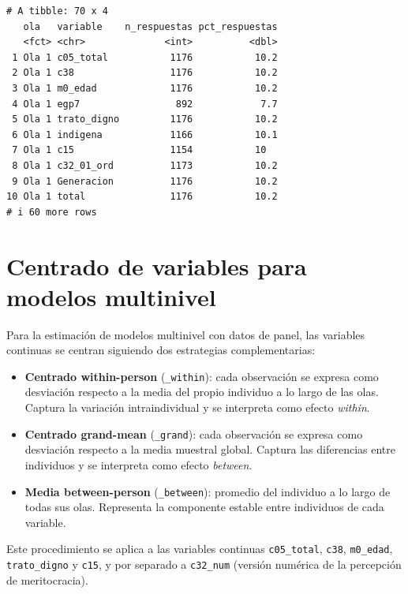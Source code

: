 \documentclass[
  spanish,
  a4paper,
  oneside]{scrbook}
\providecommand{\tightlist}{%
  \setlength{\itemsep}{0pt}\setlength{\parskip}{0pt}}
\begin{document}
\begin{verbatim}
# A tibble: 70 x 4
   ola   variable    n_respuestas pct_respuestas
   <fct> <chr>              <int>          <dbl>
 1 Ola 1 c05_total           1176           10.2
 2 Ola 1 c38                 1176           10.2
 3 Ola 1 m0_edad             1176           10.2
 4 Ola 1 egp7                 892            7.7
 5 Ola 1 trato_digno         1176           10.2
 6 Ola 1 indigena            1166           10.1
 7 Ola 1 c15                 1154           10  
 8 Ola 1 c32_01_ord          1173           10.2
 9 Ola 1 Generacion          1176           10.2
10 Ola 1 total               1176           10.2
# i 60 more rows
\end{verbatim}

\chapter{Centrado de variables para modelos
multinivel}\label{centrado-de-variables-para-modelos-multinivel}

Para la estimación de modelos multinivel con datos de panel, las
variables continuas se centran siguiendo dos estrategias
complementarias:

\begin{itemize}
\tightlist
\item
  \textbf{Centrado within-person} (\texttt{\_within}): cada observación
  se expresa como desviación respecto a la media del propio individuo a
  lo largo de las olas. Captura la variación intraindividual y se
  interpreta como efecto \emph{within}.
\item
  \textbf{Centrado grand-mean} (\texttt{\_grand}): cada observación se
  expresa como desviación respecto a la media muestral global. Captura
  las diferencias entre individuos y se interpreta como efecto
  \emph{between}.
\item
  \textbf{Media between-person} (\texttt{\_between}): promedio del
  individuo a lo largo de todas sus olas. Representa la componente
  estable entre individuos de cada variable.
\end{itemize}

Este procedimiento se aplica a las variables continuas
\texttt{c05\_total}, \texttt{c38}, \texttt{m0\_edad},
\texttt{trato\_digno} y \texttt{c15}, y por separado a \texttt{c32\_num}
(versión numérica de la percepción de meritocracia).
\end{document}
